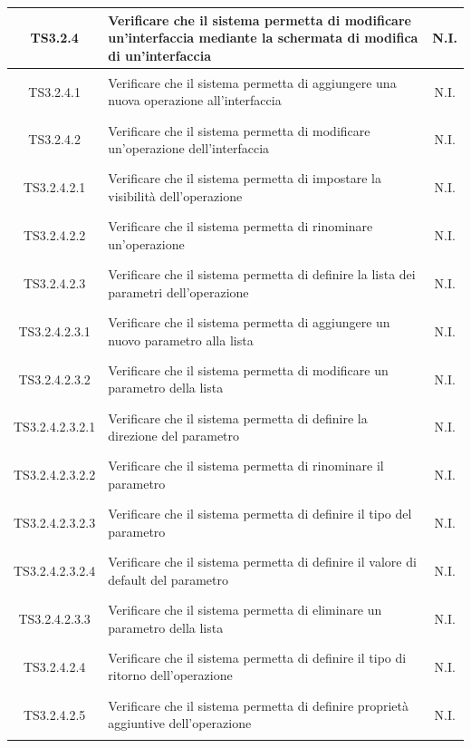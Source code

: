 \documentclass[../PianoDiQualifica.tex]{subfiles}
\begin{document}
\begin{longtable}{|c|>{\centering}p{10cm}|c|}
	\hline
	\hypertarget{TS3.2.4}{TS3.2.4} & Verificare che il sistema permetta di modificare un'interfaccia mediante la schermata di modifica di un'interfaccia & N.I. \\
	\hline
	\hypertarget{TS3.2.4.1}{TS3.2.4.1} & Verificare che il sistema permetta di aggiungere una nuova operazione all'interfaccia & N.I. \\
	\hline
	\hypertarget{TS3.2.4.2}{TS3.2.4.2} & Verificare che il sistema permetta di modificare un'operazione dell'interfaccia & N.I. \\
	\hline
	\hypertarget{TS3.2.4.2.1}{TS3.2.4.2.1} & Verificare che il sistema permetta di impostare la visibilità dell'operazione & N.I. \\
	\hline
	\hypertarget{TS3.2.4.2.2}{TS3.2.4.2.2} & Verificare che il sistema permetta di rinominare un'operazione & N.I. \\
	\hline
	\hypertarget{TS3.2.4.2.3}{TS3.2.4.2.3} & Verificare che il sistema permetta di definire la lista dei parametri dell'operazione & N.I. \\
	\hline
	\hypertarget{TS3.2.4.2.3.1}{TS3.2.4.2.3.1} & Verificare che il sistema permetta di aggiungere un nuovo parametro alla lista & N.I. \\
	\hline
	\hypertarget{TS3.2.4.2.3.2}{TS3.2.4.2.3.2} & Verificare che il sistema permetta di modificare un parametro della lista & N.I. \\
	\hline
	\hypertarget{TS3.2.4.2.3.2.1}{TS3.2.4.2.3.2.1} & Verificare che il sistema permetta di definire la direzione del parametro & N.I. \\
	\hline
	\hypertarget{TS3.2.4.2.3.2.2}{TS3.2.4.2.3.2.2} & Verificare che il sistema permetta di rinominare il parametro & N.I. \\
	\hline
	\hypertarget{TS3.2.4.2.3.2.3}{TS3.2.4.2.3.2.3} & Verificare che il sistema permetta di definire il tipo del parametro & N.I. \\
	\hline
	\hypertarget{TS3.2.4.2.3.2.4}{TS3.2.4.2.3.2.4} & Verificare che il sistema permetta di definire il valore di default del parametro & N.I. \\
	\hline
	\hypertarget{TS3.2.4.2.3.3}{TS3.2.4.2.3.3} & Verificare che il sistema permetta di eliminare un parametro della lista & N.I. \\
	\hline
	\hypertarget{TS3.2.4.2.4}{TS3.2.4.2.4} & Verificare che il sistema permetta di definire il tipo di ritorno dell'operazione & N.I. \\
	\hline
	\hypertarget{TS3.2.4.2.5}{TS3.2.4.2.5} & Verificare che il sistema permetta di definire proprietà aggiuntive dell'operazione & N.I. \\

\end{longtable}
\end{document}
